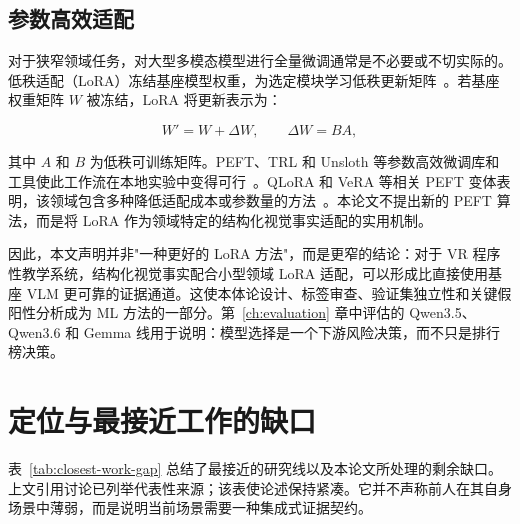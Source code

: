\subsection{参数高效适配}\label{sec:bg-lora}

对于狭窄领域任务，对大型多模态模型进行全量微调通常是不必要或不切实际的。低秩适配（LoRA）冻结基座模型权重，为选定模块学习低秩更新矩阵~\citep{hu2021lora}。若基座权重矩阵 \(W\) 被冻结，LoRA 将更新表示为：

\[
  W' = W + \Delta W,\qquad \Delta W = BA,
\]

其中 \(A\) 和 \(B\) 为低秩可训练矩阵。PEFT、TRL 和 Unsloth 等参数高效微调库和工具使此工作流在本地实验中变得可行~\citep{mangrulkar2022peft,vonwerra2020trl,unsloth2024}。QLoRA 和 VeRA 等相关 PEFT 变体表明，该领域包含多种降低适配成本或参数量的方法~\citep{dettmers2023qlora,kopiczko2023vera}。本论文不提出新的 PEFT 算法，而是将 LoRA 作为领域特定的结构化视觉事实适配的实用机制。

因此，本文声明并非"一种更好的 LoRA 方法"，而是更窄的结论：对于 VR 程序性教学系统，结构化视觉事实配合小型领域 LoRA 适配，可以形成比直接使用基座 VLM 更可靠的证据通道。这使本体论设计、标签审查、验证集独立性和关键假阳性分析成为 ML 方法的一部分。第~\ref{ch:evaluation} 章中评估的 Qwen3.5、Qwen3.6 和 Gemma 线用于说明：模型选择是一个下游风险决策，而不只是排行榜决策。

\section{定位与最接近工作的缺口}\label{sec:bg-positioning}

表~\ref{tab:closest-work-gap} 总结了最接近的研究线以及本论文所处理的剩余缺口。上文引用讨论已列举代表性来源；该表使论述保持紧凑。它并不声称前人在其自身场景中薄弱，而是说明当前场景需要一种集成式证据契约。

